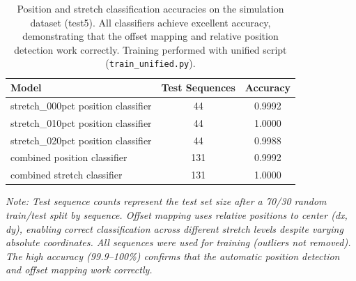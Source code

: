 \documentclass[11pt,a4paper]{article}
\begin{document}
\begin{table}[H]
    \centering
    \caption{Position and stretch classification accuracies on the simulation dataset (test5). All classifiers
             achieve excellent accuracy, demonstrating that the offset mapping and relative position detection work correctly.
             Training performed with unified script (\texttt{train\_unified.py}).}
    \label{tab:sim-offset-test5}
    \begin{tabular}{@{}lcc@{}}
        \toprule
        Model & Test Sequences & Accuracy \\
        \midrule
        stretch\_000pct position classifier & 44 & 0.9992 \\
        stretch\_010pct position classifier & 44 & 1.0000 \\
        stretch\_020pct position classifier & 44 & 0.9988 \\
        combined position classifier & 131 & 0.9992 \\
        combined stretch classifier & 131 & 1.0000 \\
        \bottomrule
    \end{tabular}
    \vspace{0.1cm}
    \footnotesize
    \textit{Note: Test sequence counts represent the test set size after a 70/30 random train/test split by sequence. Offset mapping uses relative positions to center (dx, dy), enabling correct classification across different stretch levels despite varying absolute coordinates. All sequences were used for training (outliers not removed). The high accuracy (99.9--100\%) confirms that the automatic position detection and offset mapping work correctly.}
\end{table}
\end{document}
